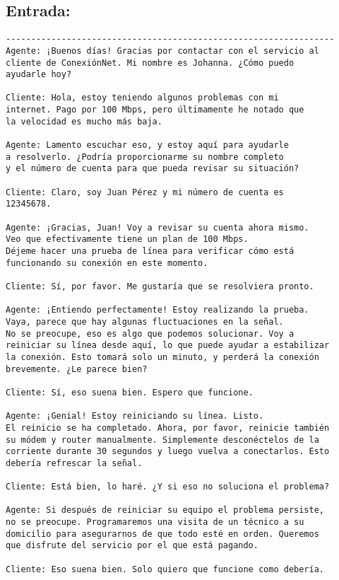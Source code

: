 \documentclass[12pt,a4paper]{article}
\begin{document}
\subsection*{Entrada:}
\begin{verbatim}
-----------------------------------------------------------------    
Agente: ¡Buenos días! Gracias por contactar con el servicio al 
cliente de ConexiónNet. Mi nombre es Johanna. ¿Cómo puedo 
ayudarle hoy?

Cliente: Hola, estoy teniendo algunos problemas con mi 
internet. Pago por 100 Mbps, pero últimamente he notado que 
la velocidad es mucho más baja.

Agente: Lamento escuchar eso, y estoy aquí para ayudarle 
a resolverlo. ¿Podría proporcionarme su nombre completo 
y el número de cuenta para que pueda revisar su situación?

Cliente: Claro, soy Juan Pérez y mi número de cuenta es 
12345678.

Agente: ¡Gracias, Juan! Voy a revisar su cuenta ahora mismo.
Veo que efectivamente tiene un plan de 100 Mbps. 
Déjeme hacer una prueba de línea para verificar cómo está 
funcionando su conexión en este momento.

Cliente: Sí, por favor. Me gustaría que se resolviera pronto.

Agente: ¡Entiendo perfectamente! Estoy realizando la prueba.
Vaya, parece que hay algunas fluctuaciones en la señal. 
No se preocupe, eso es algo que podemos solucionar. Voy a 
reiniciar su línea desde aquí, lo que puede ayudar a estabilizar 
la conexión. Esto tomará solo un minuto, y perderá la conexión 
brevemente. ¿Le parece bien?

Cliente: Sí, eso suena bien. Espero que funcione.

Agente: ¡Genial! Estoy reiniciando su línea. Listo. 
El reinicio se ha completado. Ahora, por favor, reinicie también 
su módem y router manualmente. Simplemente desconéctelos de la 
corriente durante 30 segundos y luego vuelva a conectarlos. Esto 
debería refrescar la señal.

Cliente: Está bien, lo haré. ¿Y si eso no soluciona el problema?

Agente: Si después de reiniciar su equipo el problema persiste, 
no se preocupe. Programaremos una visita de un técnico a su 
domicilio para asegurarnos de que todo esté en orden. Queremos 
que disfrute del servicio por el que está pagando.

Cliente: Eso suena bien. Solo quiero que funcione como debería.


\end{verbatim}
\end{document}
